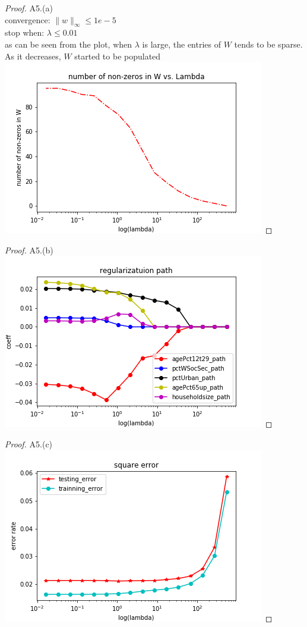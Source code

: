 \documentclass[12pt]{article}
\begin{document}
\begin{proof}
        A5.(a)\\     
        convergence: $\|w\|_{\infty} \leq  1e-5$ \\
        stop when: $\lambda \leq  0.01$\\
        as can be seen from the plot, when $\lambda$ is large, the entries of $W$ tends to be sparse. As it decreases, $W$ started to be populated\\

        \includegraphics{../code/A5_a.png}
\end{proof}
\newpage
\begin{proof}
        A5.(b)\\     
        \includegraphics{../code/A5_b.png}
\end{proof}
\newpage
\begin{proof}
        A5.(c)\\     
        \includegraphics{../code/A5_c.png}
\end{proof}
\end{document}
